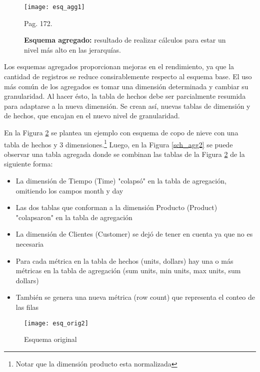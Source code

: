 \documentclass[a4paper,11pt]{article}
\begin{document}
\begin{flushleft}
    \begin{figure}
      \begin{center}
        \texttt{[image: esq\_agg1]}
        \caption{\textbf{Esquema agregado:} resultado de realizar cálculos para estar un nivel más alto en las jerarquías.} \cite{nagabhushana} Pag. 172.
        \label{sch_agg1}
      \end{center}
    \end{figure}
    
    
    Los esquemas agregados proporcionan mejoras en el rendimiento, ya que la cantidad de registros se reduce consirablemente respecto al esquema base. El
    uso más común de los agregados es tomar una dimensión determinada y cambiar su granularidad. Al hacer ésto, la tabla de hechos debe ser parcialmente
    resumida para adaptarse a la nueva dimensión. Se crean así, nuevas tablas de dimensión y de hechos, que encajan en el nuevo nivel de granularidad.\par
    
    En la Figura \ref{sch_orig2} se plantea un ejemplo con esquema de copo de nieve con una tabla de hechos y 3 dimensiones.\footnote{Notar que la
    dimensión producto esta normalizada} Luego, en la Figura \ref{sch_agg2} se puede observar una tabla agregada donde se combinan las tablas de la
    Figura \ref{sch_orig2} de la siguiente forma:\par
    
    \begin{itemize}
      \item La dimensión de Tiempo (Time) "colapsó" en la tabla de agregación, omitiendo los campos month y day
      \item Las dos tablas que conforman a la dimensión Producto (Product) "colapsaron" en la tabla de agregación
      \item La dimensión de Clientes (Customer) se dejó de tener en cuenta ya que no es necesaria
      \item Para cada métrica en la tabla de hechos (units, dollars) hay una o más métricas en la tabla de agregación (sum units, min units, max units,
      sum dollars)
      \item También se genera una nueva métrica (row count) que representa el conteo de las filas
    \end{itemize}
    
    \begin{figure}
      \begin{center}
        \texttt{[image: esq\_orig2]}
        \caption{Esquema original} \cite{agg_tables}
        \label{sch_orig2}
      \end{center}
    \end{figure}
    

\end{flushleft}
\end{document}
